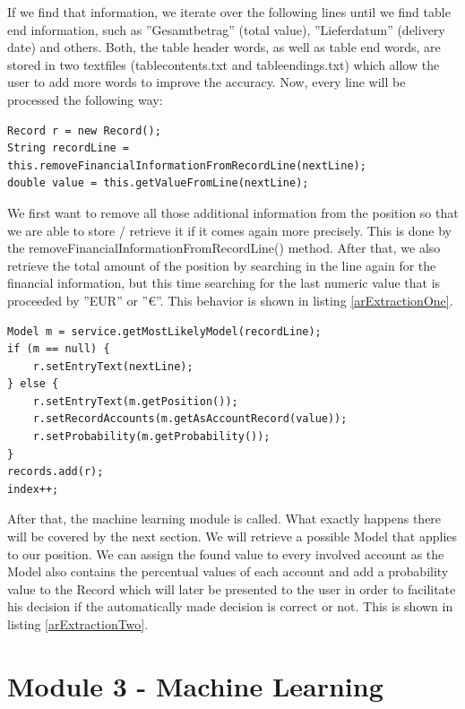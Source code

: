 If we find that information, we iterate over the following lines until we find table end information, such as ''Gesamtbetrag'' (total value), ''Lieferdatum'' (delivery date) and others. Both, the table header words, as well as table end words, are stored in two textfiles (tablecontents.txt and tableendings.txt) which allow the user to add more words to improve the accuracy.
Now, every line will be processed the following way:

\begin{lstlisting}[caption={Manipulating and retrieving information from a position},label={arExtractionOne}]
Record r = new Record();
String recordLine = this.removeFinancialInformationFromRecordLine(nextLine);
double value = this.getValueFromLine(nextLine);
\end{lstlisting}

We first want to remove all those additional information from the position so that we are able to store / retrieve it if it comes again more precisely. This is done by the removeFinancialInformationFromRecordLine() method. 
After that, we also retrieve the total amount of the position by searching in the line again for the financial information, but this time searching for the last numeric value that is proceeded by ''EUR'' or ''\euro''. This behavior is shown in listing \ref{arExtractionOne}.

\begin{lstlisting}[caption={Finding a model for the position},label={arExtractionTwo}]
Model m = service.getMostLikelyModel(recordLine); 
if (m == null) {
    r.setEntryText(nextLine);
} else {
    r.setEntryText(m.getPosition());
    r.setRecordAccounts(m.getAsAccountRecord(value));
    r.setProbability(m.getProbability());
}
records.add(r);
index++;
\end{lstlisting}

After that, the machine learning module is called. What exactly happens there will be covered by the next section. We will retrieve a possible Model that applies to our position. We can assign the found value to every involved account as the Model also contains the percentual values of each account and add a probability value to the Record which will later be presented to the user in order to facilitate his decision if the automatically made decision is correct or not. This is shown in listing \ref{arExtractionTwo}.


\section{Module 3 - Machine Learning}
\label{sec5.6}

